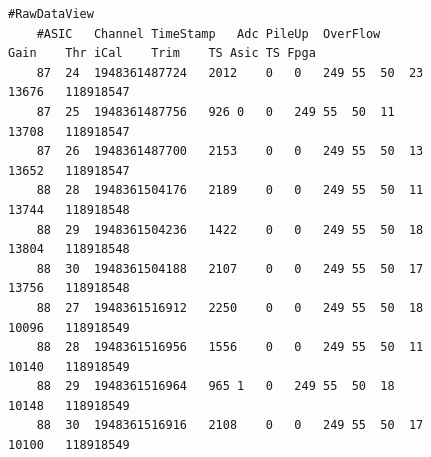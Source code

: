 \documentclass[a4paper, 11pt, twoside, openright]{article}
\begin{document}
	\begin{figure}[h]

		\begin{lstlisting}[style=CStyle,caption={Zawartość pliku *more.txt},label={lst:more}]
	#RawDataView
	#ASIC	Channel	TimeStamp	Adc	PileUp	OverFlow	Gain	Thr	iCal	Trim	TS Asic	TS Fpga
	87	24	1948361487724	2012	0	0	249	55	50	23	13676	118918547
	87	25	1948361487756	926	0	0	249	55	50	11	13708	118918547
	87	26	1948361487700	2153	0	0	249	55	50	13	13652	118918547
	88	28	1948361504176	2189	0	0	249	55	50	11	13744	118918548
	88	29	1948361504236	1422	0	0	249	55	50	18	13804	118918548
	88	30	1948361504188	2107	0	0	249	55	50	17	13756	118918548
	88	27	1948361516912	2250	0	0	249	55	50	18	10096	118918549
	88	28	1948361516956	1556	0	0	249	55	50	11	10140	118918549
	88	29	1948361516964	965	1	0	249	55	50	18	10148	118918549
	88	30	1948361516916	2108	0	0	249	55	50	17	10100	118918549 \end{lstlisting}

	\end{figure}

	\begin{table}[h]

		\caption{Pierwsze 10 rekordów pliku .txt}
		\label{tab:data}

	\end{table}
\end{document}
